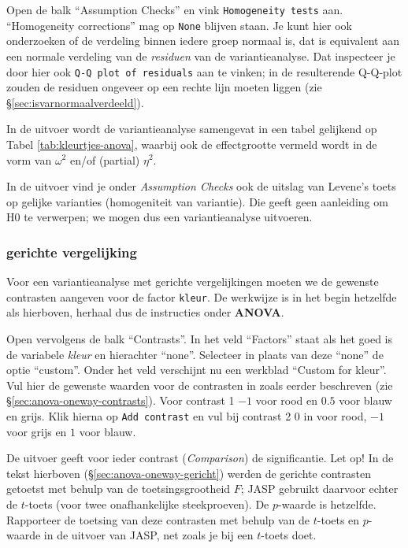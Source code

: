 \documentclass[
]{book}
\begin{document}
Open de balk ``Assumption Checks'' en vink \texttt{Homogeneity\ tests} aan. ``Homogeneity corrections'' mag op \texttt{None} blijven staan. Je kunt hier ook onderzoeken of de verdeling binnen iedere groep normaal is, dat is equivalent aan een normale verdeling van de \emph{residuen} van de variantieanalyse. Dat inspecteer je door hier ook \texttt{Q-Q\ plot\ of\ residuals} aan te vinken; in de resulterende Q-Q-plot zouden de residuen ongeveer op een rechte lijn moeten liggen (zie §\ref{sec:isvarnormaalverdeeld}).

In de uitvoer wordt de variantieanalyse samengevat in een tabel gelijkend op Tabel \ref{tab:kleurtjes-anova}, waarbij ook de effectgrootte vermeld wordt in de vorm van \(\omega^2\) en/of (partial) \(\eta^2\).

In de uitvoer vind je onder \emph{Assumption Checks} ook de uitslag van Levene's toets op gelijke
varianties (homogeniteit van variantie). Die geeft geen aanleiding om H0
te verwerpen; we mogen dus een variantieanalyse uitvoeren.

\subsubsection{gerichte vergelijking}\label{gerichte-vergelijking-1}

Voor een variantieanalyse met gerichte vergelijkingen moeten we de
gewenste contrasten aangeven voor de factor \texttt{kleur}. De werkwijze is in het begin
hetzelfde als hierboven, herhaal dus de instructies onder \textbf{ANOVA}.

Open vervolgens de balk ``Contrasts''. In het veld ``Factors'' staat als het goed is de variabele \emph{kleur} en hierachter ``none''. Selecteer in plaats van deze ``none'' de optie ``custom''. Onder het veld verschijnt nu een werkblad ``Custom for kleur''. Vul hier de gewenste waarden voor de contrasten in zoals eerder beschreven (zie §\ref{sec:anova-oneway-contrasts}). Voor contrast 1 \(-1\) voor rood en \(0.5\) voor blauw en grijs. Klik hierna op \texttt{Add\ contrast} en vul bij contrast 2 \(0\) in voor rood, \(-1\) voor grijs en \(1\) voor blauw.

De uitvoer geeft voor ieder contrast (\emph{Comparison}) de significantie. Let op!
In de tekst hierboven (§\ref{sec:anova-oneway-gericht}) werden de gerichte contrasten getoetst met behulp van de toetsingsgrootheid \(F\);
JASP gebruikt daarvoor echter de \(t\)-toets (voor twee onafhankelijke steekproeven). De \(p\)-waarde is hetzelfde. Rapporteer de toetsing van deze contrasten met behulp van de \(t\)-toets en \(p\)-waarde in de uitvoer van JASP, net zoals je bij een \(t\)-toets doet.
\end{document}
